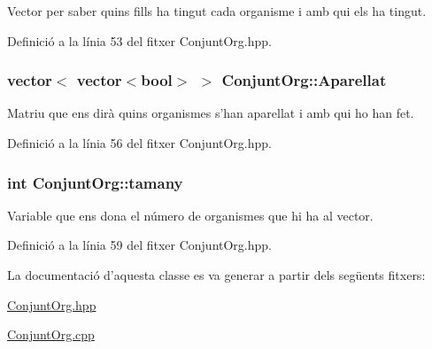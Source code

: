 Vector per saber quins fills ha tingut cada organisme i amb qui els ha tingut. 



Definició a la línia 53 del fitxer Conjunt\-Org.\-hpp.

\hypertarget{class_conjunt_org_a9782fdb4c89e8dd61762453de8f77fcb}{
\subsubsection[{Aparellat}]{\setlength{\rightskip}{0pt plus 5cm}vector$<$ vector$<$bool$>$ $>$ Conjunt\-Org\-::\-Aparellat\hspace{0.3cm}{\ttfamily [private]}}}\label{class_conjunt_org_a9782fdb4c89e8dd61762453de8f77fcb}


Matriu que ens dirà quins organismes s'han aparellat i amb qui ho han fet. 



Definició a la línia 56 del fitxer Conjunt\-Org.\-hpp.

\hypertarget{class_conjunt_org_a468e7686498561628ad731ea196df8b5}{
\subsubsection[{tamany}]{\setlength{\rightskip}{0pt plus 5cm}int Conjunt\-Org\-::tamany\hspace{0.3cm}{\ttfamily [private]}}}\label{class_conjunt_org_a468e7686498561628ad731ea196df8b5}


Variable que ens dona el número de organismes que hi ha al vector. 



Definició a la línia 59 del fitxer Conjunt\-Org.\-hpp.



La documentació d'aquesta classe es va generar a partir dels següents fitxers\-:\begin{DoxyCompactItemize}
\item 
\hyperlink{_conjunt_org_8hpp}{Conjunt\-Org.\-hpp}\item 
\hyperlink{_conjunt_org_8cpp}{Conjunt\-Org.\-cpp}\end{DoxyCompactItemize}

